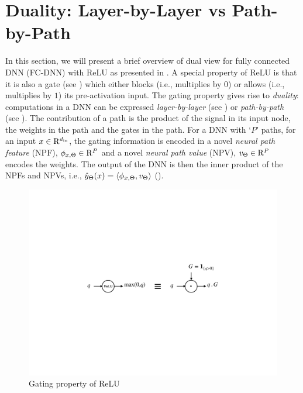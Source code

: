\section{Duality: Layer-by-Layer vs Path-by-Path}\label{sec:dual}
In this section, we will present a brief overview of dual view for fully connected DNN (FC-DNN) with ReLU as presented in \cite{npk}. A special property of ReLU is that it is also a gate (see ) which either blocks (i.e., multiplies by $0$) or allows (i.e., multiplies by $1$) its pre-activation input. The gating property gives rise to \emph{duality}: computations in a DNN can be expressed \emph{layer-by-layer} (see ) or \emph{path-by-path} (see ). The contribution of a path is the product of the signal in its input node, the weights in the path and the gates in the path. For a DNN with `$P$' paths, for an input $x\in\mathrm{R}^{d_{\text{in}}}$,  the gating information is encoded in a novel \emph{neural path feature} (NPF), $\phi_{x,\Theta}\in\mathrm{R}^P$ and a novel \emph{neural path value} (NPV), $v_{\Theta}\in\mathrm{R}^P$ encodes the weights.  The output of the DNN is then the inner product of the NPFs and NPVs, i.e., $\hat{y}_{\Theta}(x)=\langle \phi_{x,\Theta},v_{\Theta}\rangle$ ().
\FloatBarrier
\begin{figure}[H]
\centering
\includegraphics[scale=0.25]{figs/gating.pdf}
\caption{Gating property of ReLU}
\label{fig:gating}
\end{figure}
